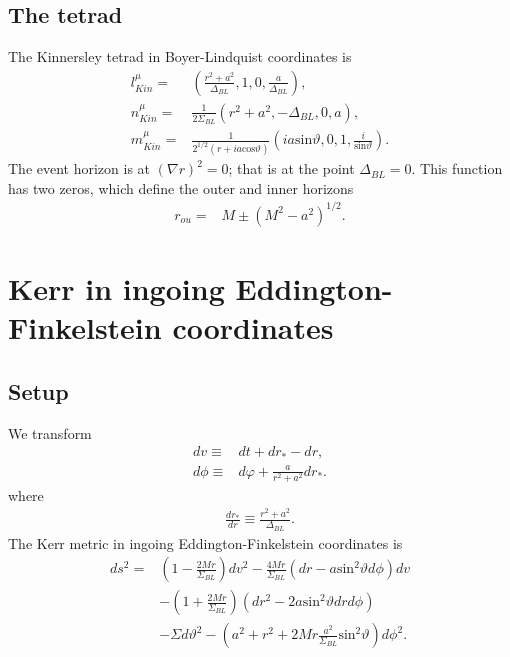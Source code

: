 \documentclass[12pt]{report}
\begin{document}
\subsection{The tetrad}
	The Kinnersley tetrad in Boyer-Lindquist coordinates is
\begin{subequations}
\label{eq:Kinnersley_tetrad_BL}
\begin{align}
	l_{Kin}^{\mu}
	= &
	\left(\frac{r^2+a^2}{\Delta_{BL}},1,0,\frac{a}{\Delta_{BL}}\right)
	, \\
	n_{Kin}^{\mu}
	= &
	\frac{1}{2\Sigma_{BL}}\left(r^2+a^2,-\Delta_{BL},0,a\right)
	, \\
	m_{Kin}^{\mu}
	= &
	\frac{1}{2^{1/2}\left(r+ia\mathrm{cos}\vartheta\right)}
	\left(
		ia\mathrm{sin}\vartheta,0,1,\frac{i}{\mathrm{sin}\vartheta}
	\right)
	.
\end{align}
\end{subequations}
	The event horizon is at $(\nabla r)^2=0$;
that is at the point $\Delta_{BL}=0$. This function has two zeros, which
define the outer and inner horizons
\begin{subequations}
\begin{align}
	r_{ou} 
	= & 
	M \pm \left(M^2-a^2\right)^{1/2}
	.
\end{align}
\end{subequations}
\section{Kerr in ingoing Eddington-Finkelstein coordinates}
\subsection{Setup}
	We transform
\begin{subequations}
\begin{align}
	dv 
	\equiv & 
	dt + dr_* - dr 
	, \\
	d\phi 
	\equiv & 
	d\varphi + \frac{a}{r^2+a^2}dr_*
	.
\end{align}
\end{subequations}
	where
\begin{align}
	\frac{dr_*}{dr} 
	\equiv
	\frac{r^2+a^2}{\Delta_{BL}}
	.
\end{align}
	The Kerr metric in ingoing Eddington-Finkelstein coordinates is
\begin{align}
	ds^2
	= &
	\left(1-\frac{2Mr}{\Sigma_{BL}}\right)dv^2
-	\frac{4Mr}{\Sigma_{BL}}\left(
		dr
	-	a\mathrm{sin}^2\vartheta d\phi
	\right)
	dv
	\nonumber \\ &
-	\left(1+\frac{2Mr}{\Sigma_{BL}}\right)
	\left(
		dr^2
	-	2a\mathrm{sin}^2\vartheta drd\phi
	\right)
	\nonumber \\ &
-	\Sigma d\vartheta^2
-	\left(
		a^2+r^2+2Mr\frac{a^2}{\Sigma_{BL}}\mathrm{sin}^2\vartheta
	\right)
	d\phi^2
	.
\end{align}
\end{document}
